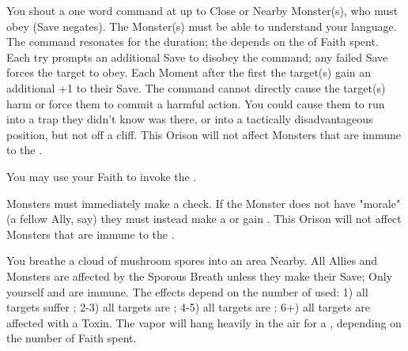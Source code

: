 \begin{multicols*}{2}
You shout a one word command at up to \DICE Close or Nearby Monster(s), who must obey (Save negates).  The Monster(s) must be able to understand your language.  The command resonates for the duration; the \Duration depends on the \DICE of Faith spent.  Each \Duration try prompts an additional Save to disobey the command; any failed Save forces the target to obey. Each Moment after the first the target(s) gain an additional +1 to their Save.  The command cannot directly cause the target(s) harm or force them to commit a harmful action.  You could cause them to run into a trap they didn't know was there, or into a tactically disadvantageous position, but not off a cliff. This Orison will not affect Monsters that are immune to the .

\LITURGY [
  Name = Scourge of Chaos,
  Link = arcana-mystery-scourge-of-chaos,
  Paradigm = Righteous,
  Duration=1 Combat Action
]

You may use your Faith to invoke the .

\LITURGY [
  Name = Spook,
  Link = arcana-mystery-spook,
  Paradigm = Cunning,
  Duration=1 Combat Action
]

\DICE Monsters must immediately make a  check. If the Monster does not have "morale" (a fellow Ally, say) they must instead make a  or gain . This Orison will not affect Monsters that are immune to the .

\LITURGY [
  Name = Sporous Vapor,
  Link = arcana-mystery-sporous-vapor,
  Paradigm = Heathen,
  Duration=1 Combat Action
]

You breathe a cloud of mushroom spores into an area Nearby.  All Allies and Monsters are affected by the Sporous Breath unless they make their Save; Only yourself and  are immune.  The effects depend on the number of \DICE used: 1) all targets suffer ; 2-3) all targets are ; 4-5) all targets are ; 6+) all targets are affected with a  Toxin. The vapor will hang heavily in the air for a \Duration, depending on the number of Faith spent.

\newpage

\LITURGY [
  Name = Vile Hunger,
  Link = arcana-mystery-vile-hunger,
  Paradigm = Ruinous,
  Duration=1 Combat Action
]


\end{multicols*}
